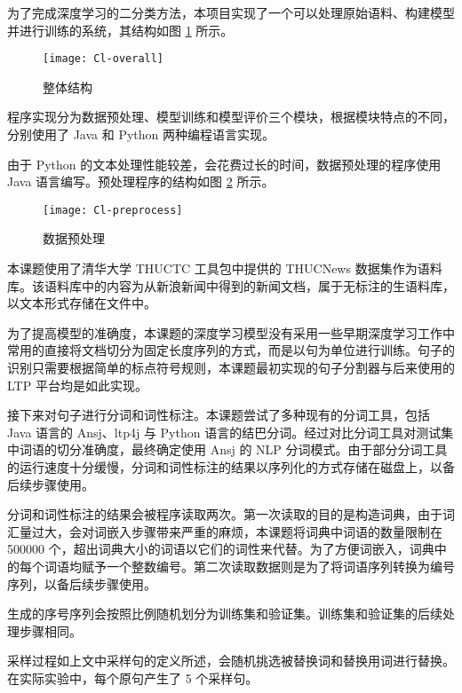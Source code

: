 \label{s:classifer implementation}
为了完成深度学习的二分类方法，本项目实现了一个可以处理原始语料、构建模型并进行训练的系统，其结构如图 \ref{f:classfier overall} 所示。
\begin{figure}[h]
	\centering
	\texttt{[image: Cl-overall]}
	\caption{整体结构}
	\label{f:classfier overall}
	\vspace{-1em}
\end{figure}

程序实现分为数据预处理、模型训练和模型评价三个模块，根据模块特点的不同，分别使用了 Java 和 Python 两种编程语言实现。

\label{s:classfier preprocess}
由于 Python 的文本处理性能较差，会花费过长的时间，数据预处理的程序使用 Java 语言编写。预处理程序的结构如图 \ref{f:classfier preprocess} 所示。

\begin{figure}[h]
	\centering
	\texttt{[image: Cl-preprocess]}
	\caption{数据预处理}
	\label{f:classfier preprocess}
	\vspace{-1em}
\end{figure}

本课题使用了清华大学 THUCTC 工具包中提供的 THUCNews 数据集作为语料库。该语料库中的内容为从新浪新闻中得到的新闻文档，属于无标注的生语料库，以文本形式存储在文件中。

为了提高模型的准确度，本课题的深度学习模型没有采用一些早期深度学习工作中常用的直接将文档切分为固定长度序列的方式，而是以句为单位进行训练。句子的识别只需要根据简单的标点符号规则，本课题最初实现的句子分割器与后来使用的 LTP 平台均是如此实现。

接下来对句子进行分词和词性标注。本课题尝试了多种现有的分词工具，包括 Java 语言的 Ansj、ltp4j 与 Python 语言的结巴分词。经过对比分词工具对测试集中词语的切分准确度，最终确定使用 Ansj 的 NLP 分词模式。由于部分分词工具的运行速度十分缓慢，分词和词性标注的结果以序列化的方式存储在磁盘上，以备后续步骤使用。

分词和词性标注的结果会被程序读取两次。第一次读取的目的是构造词典，由于词汇量过大，会对词嵌入步骤带来严重的麻烦，本课题将词典中词语的数量限制在 500000 个，超出词典大小的词语以它们的词性来代替。为了方便词嵌入，词典中的每个词语均赋予一个整数编号。第二次读取数据则是为了将词语序列转换为编号序列，以备后续步骤使用。

生成的序号序列会按照比例随机划分为训练集和验证集。训练集和验证集的后续处理步骤相同。

采样过程如上文中采样句的定义所述，会随机挑选被替换词和替换用词进行替换。在实际实验中，每个原句产生了 5 个采样句。

